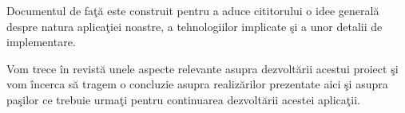 Documentul de faţă este construit pentru a aduce cititorului o idee generală 
despre natura aplicaţiei noastre, a tehnologiilor implicate şi a unor detalii 
de implementare.

Vom trece în revistă unele aspecte relevante asupra dezvoltării acestui proiect 
şi vom încerca să tragem o concluzie asupra realizărilor prezentate aici şi 
asupra paşilor ce trebuie urmaţi pentru continuarea dezvoltării acestei 
aplicaţii.